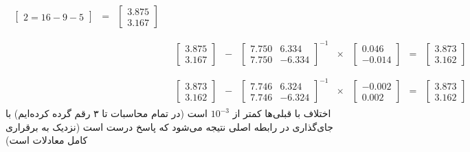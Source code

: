 {\begin{align*}
\begin{array}{ccccccc}
\begin{bmatrix}
    2 = 16 - 9 - 5
\end{bmatrix} &= &
\begin{bmatrix}
    3.875 \\
    3.167
\end{bmatrix}
\end{array} \\
&\begin{array}{ccccccc}
 & & & & & \\
\begin{bmatrix}
    3.875 \\
    3.167
\end{bmatrix} & - & 
\begin{bmatrix}
    ‌7.750 & 6.334 \\
    7.750 & -6.334
\end{bmatrix}^{-1} & \times &
\begin{bmatrix}
    0.046\\
    -0.014
\end{bmatrix} &= &
\begin{bmatrix}
    3.873 \\
    3.162 
\end{bmatrix}
\end{array}
\\
&\begin{array}{ccccccc}
 & & & & & \\
\begin{bmatrix}
    3.873 \\
    3.162
\end{bmatrix} & - & 
\begin{bmatrix}
    7.746 & 6.324 \\
    7.746 & -6.324
\end{bmatrix}^{-1} & \times &
\begin{bmatrix}
    -0.002 \\
    0.002
\end{bmatrix} &= &
\begin{bmatrix}
    3.873 \\
    3.162
\end{bmatrix}
\end{array}
\end{align*}
اختلاف با قبلی‌ها کمتر از
$10^{-3}$
است
(در تمام محاسبات تا ۳ رقم گرده
کرده‌ایم)
با جای‌گذاری در رابطه اصلی نتیجه می‌شود که پاسخ درست است 
(نزدیک به برقراری کامل معادلات است)
}

